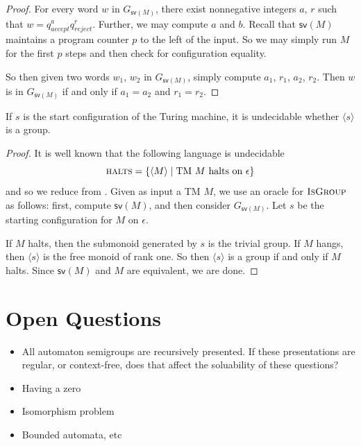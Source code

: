 \documentclass[11pt, titlepage]{article}
\begin{document}
\begin{proof}
  For every word $w$ in $G_{\textsf{sv}(M)}$, there exist nonnegative
  integers $a$, $r$ such that $w = q_{accept}^a
  q_{reject}^r$. Further, we may compute $a$ and $b$. Recall that
  $\textsf{sv}(M)$ maintains a program counter $p$ to the left of the
  input. So we may simply run $M$ for the first $p$ steps and then
  check for configuration equality.

  So then given two words $w_1$, $w_2$ in $G_{\textsf{sv}(M)}$, simply
  compute $a_1$, $r_1$, $a_2$, $r_2$. Then $w$ is in
  $G_{\textsf{sv}(M)}$ if and only if $a_1 = a_2$ and $r_1 = r_2$.
\end{proof}

\begin{proposition}
If $s$ is the start configuration of the Turing
machine, it is undecidable whether $\langle s \rangle$ is a group.
\end{proposition}

\begin{proof}
  It is well known that the following language is undecidable
  \[
    \textsc{halts} = \{\langle M \rangle \mid \text{TM $M$ halts on
      $\epsilon$} \}
  \]
  and so we reduce from . Given as input a TM $M$, we
  use an oracle for $\textsc{IsGroup}$ as follows: first, compute
  $\textsf{sv}(M)$, and then consider $G_{\textsf{sv}(M)}$. Let $s$ be
  the starting configuration for $M$ on $\epsilon$.

  If $M$ halts, then the submonoid generated by $s$ is the trivial
  group. If $M$ hangs, then $\langle s \rangle$ is the free monoid of
  rank one. So then $\langle s \rangle$ is a group if and only if $M$
  halts. Since $\textsf{sv}(M)$ and $M$ are equivalent, we are done.
\end{proof}

\section{Open Questions}

\begin{itemize}
\item All automaton semigroups are recursively presented. If these
  presentations are regular, or context-free, does that affect the
  soluability of these questions?
\item Having a zero
\item Isomorphism problem
\item Bounded automata, etc
\end{itemize}

\nocite{*}

\end{document}

